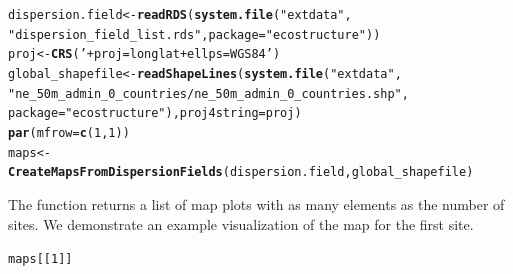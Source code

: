 \documentclass[12pt]{article}\usepackage[]{graphicx}\usepackage[usenames,dvipsnames]{color}
\makeatletter
\newcommand{\hlnum}[1]{\textcolor[rgb]{0.686,0.059,0.569}{#1}}%
\newcommand{\hlstr}[1]{\textcolor[rgb]{0.192,0.494,0.8}{#1}}%
\newcommand{\hlstd}[1]{\textcolor[rgb]{0.345,0.345,0.345}{#1}}%
\newcommand{\hlkwb}[1]{\textcolor[rgb]{0.69,0.353,0.396}{#1}}%
\newcommand{\hlkwc}[1]{\textcolor[rgb]{0.333,0.667,0.333}{#1}}%
\newcommand{\hlkwd}[1]{\textcolor[rgb]{0.737,0.353,0.396}{\textbf{#1}}}%
\newenvironment{kframe}{%
 \def\at@end@of@kframe{}%
 \ifinner\ifhmode%
  \def\at@end@of@kframe{\end{minipage}}%
  \begin{minipage}{\columnwidth}%
 \fi\fi%
 \def\FrameCommand##1{\hskip\@totalleftmargin \hskip-\fboxsep
 \colorbox{shadecolor}{##1}\hskip-\fboxsep
     \hskip-\linewidth \hskip-\@totalleftmargin \hskip\columnwidth}%
 \MakeFramed {\advance\hsize-\width
   \@totalleftmargin\z@ \linewidth\hsize
   \@setminipage}}%
 {\par\unskip\endMakeFramed%
 \at@end@of@kframe}
\newenvironment{knitrout}{}{} %
\makeatother
\begin{document}
\begin{knitrout}
\color{fgcolor}\begin{kframe}
\begin{alltt}
\hlstd{dispersion.field} \hlkwb{<-} \hlkwd{readRDS}\hlstd{(}\hlkwd{system.file}\hlstd{(}\hlstr{"extdata"}\hlstd{,}
                    \hlstr{"dispersion_field_list.rds"}\hlstd{,} \hlkwc{package} \hlstd{=} \hlstr{"ecostructure"}\hlstd{))}
\hlstd{proj} \hlkwb{<-} \hlkwd{CRS}\hlstd{(}\hlstr{' +proj=longlat +ellps=WGS84'}\hlstd{)}
\hlstd{global_shapefile} \hlkwb{<-} \hlkwd{readShapeLines}\hlstd{(}\hlkwd{system.file}\hlstd{(}\hlstr{"extdata"}\hlstd{,}
         \hlstr{"ne_50m_admin_0_countries/ne_50m_admin_0_countries.shp"}\hlstd{,}
          \hlkwc{package} \hlstd{=} \hlstr{"ecostructure"}\hlstd{),} \hlkwc{proj4string}\hlstd{=proj)}
\hlkwd{par}\hlstd{(}\hlkwc{mfrow} \hlstd{=} \hlkwd{c}\hlstd{(}\hlnum{1}\hlstd{,}\hlnum{1}\hlstd{))}
\hlstd{maps} \hlkwb{<-} \hlkwd{CreateMapsFromDispersionFields}\hlstd{(dispersion.field, global_shapefile)}
\end{alltt}
\end{kframe}
\end{knitrout}

The function returns a list of map plots with as many elements as the number of sites. We demonstrate an example visualization of the map for the first site.

\begin{knitrout}
\color{fgcolor}\begin{kframe}
\begin{alltt}
\hlstd{maps[[}\hlnum{1}\hlstd{]]}
\end{alltt}
\end{kframe}
\end{knitrout}
\end{document}
